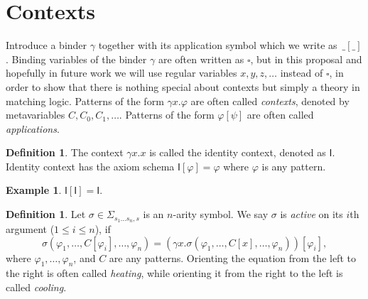 \documentclass[UTF8]{article}
\newcounter{thmcounter}
\theoremstyle{plain}
\theoremstyle{definition}
\newtheorem{definition}[thmcounter]{Definition}
\newtheorem{example}[thmcounter]{Example}
\theoremstyle{remark}
\newcommand{\I}{\mathsf{I}}
\begin{document}

\section{Contexts}

Introduce a binder $\gamma$ together with its application symbol which we write as~$\_[\_]$. Binding variables of the binder $\gamma$ are often written as $\square$, but in this proposal and hopefully in future work we will use regular variables $x, y, z, \dots$ instead of $\square$, in order to show that there is nothing special about contexts but simply a theory in matching logic. Patterns of the form $\gamma x . \varphi$ are often called \emph{contexts}, denoted by metavariables $C, C_0, C_1, \dots$. Patterns of the form $\varphi[\psi]$ are often called \emph{applications}. 
\begin{definition}
	The context $\gamma x . x$ is called the identity context, denoted as $\I$. Identity context has the axiom schema $\I[\varphi]=\varphi$ where $\varphi$ is any pattern.
\end{definition}

\begin{example}
	$\I[\I] = \I$.
\end{example}

\begin{definition}
	Let $\sigma \in \Sigma_{s_1\dots s_n, s}$ is an $n$-arity symbol. We say $\sigma$ is \emph{active} on its $i$th argument ($1 \le i \le n$), if
	$$\sigma(\varphi_1,\dots, C[\varphi_i], \dots, \varphi_n)
	= (\gamma x . \sigma(\varphi_1,\dots,C[x], \dots, \varphi_n))[\varphi_i],$$
	where $\varphi_1,\dots,\varphi_n$, and $C$ are any patterns. Orienting the equation from the left to the right is often called \emph{heating}, while orienting it from the right to the left is called \emph{cooling}.
\end{definition}
\end{document}
